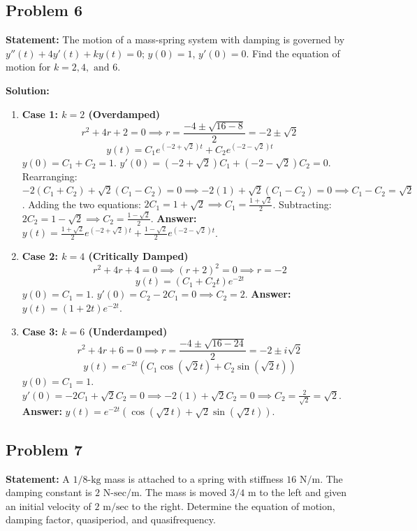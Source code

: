 \documentclass[11pt]{article}
\begin{document}
\subsection{Problem 6}
\textbf{Statement:} The motion of a mass-spring system with damping is governed by $y''(t) + 4y'(t) + ky(t) = 0$; $y(0) = 1$, $y'(0) = 0$. Find the equation of motion for $k = 2, 4, \text{ and } 6$.

\textbf{Solution:}
\begin{enumerate}
    \item \textbf{Case 1: $k = 2$ (Overdamped)}
    \[ r^2 + 4r + 2 = 0 \implies r = \frac{-4 \pm \sqrt{16 - 8}}{2} = -2 \pm \sqrt{2} \]
    \[ y(t) = C_1 e^{(-2+\sqrt{2})t} + C_2 e^{(-2-\sqrt{2})t} \]
    $y(0) = C_1 + C_2 = 1$.
    $y'(0) = (-2+\sqrt{2})C_1 + (-2-\sqrt{2})C_2 = 0$.
    Rearranging: $-2(C_1 + C_2) + \sqrt{2}(C_1 - C_2) = 0 \implies -2(1) + \sqrt{2}(C_1 - C_2) = 0 \implies C_1 - C_2 = \sqrt{2}$.
    Adding the two equations: $2C_1 = 1 + \sqrt{2} \implies C_1 = \frac{1+\sqrt{2}}{2}$.
    Subtracting: $2C_2 = 1 - \sqrt{2} \implies C_2 = \frac{1-\sqrt{2}}{2}$.
    \textbf{Answer:} $y(t) = \frac{1+\sqrt{2}}{2} e^{(-2+\sqrt{2})t} + \frac{1-\sqrt{2}}{2} e^{(-2-\sqrt{2})t}$.
    
    \item \textbf{Case 2: $k = 4$ (Critically Damped)}
    \[ r^2 + 4r + 4 = 0 \implies (r+2)^2 = 0 \implies r = -2 \]
    \[ y(t) = (C_1 + C_2 t)e^{-2t} \]
    $y(0) = C_1 = 1$.
    $y'(0) = C_2 - 2C_1 = 0 \implies C_2 = 2$.
    \textbf{Answer:} $y(t) = (1 + 2t)e^{-2t}$.
    
    \item \textbf{Case 3: $k = 6$ (Underdamped)}
    \[ r^2 + 4r + 6 = 0 \implies r = \frac{-4 \pm \sqrt{16 - 24}}{2} = -2 \pm i\sqrt{2} \]
    \[ y(t) = e^{-2t}(C_1 \cos(\sqrt{2}t) + C_2 \sin(\sqrt{2}t)) \]
    $y(0) = C_1 = 1$.
    $y'(0) = -2C_1 + \sqrt{2}C_2 = 0 \implies -2(1) + \sqrt{2}C_2 = 0 \implies C_2 = \frac{2}{\sqrt{2}} = \sqrt{2}$.
    \textbf{Answer:} $y(t) = e^{-2t}(\cos(\sqrt{2}t) + \sqrt{2}\sin(\sqrt{2}t))$.
\end{enumerate}

\subsection{Problem 7}
\textbf{Statement:} A $1/8\text{-kg}$ mass is attached to a spring with stiffness $16 \text{ N/m}$. The damping constant is $2 \text{ N-sec/m}$. The mass is moved $3/4 \text{ m}$ to the left and given an initial velocity of $2 \text{ m/sec}$ to the right. Determine the equation of motion, damping factor, quasiperiod, and quasifrequency.
\end{document}
